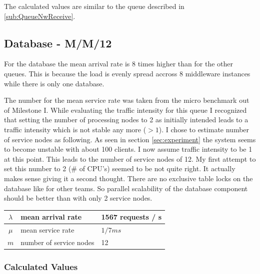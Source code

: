 \documentclass[a4paper]{article}
\begin{document}
The calculated values are similar to the queue described in \ref{sub:QueueNwReceive}. 


\subsection{Database - M/M/12}
\label{sub:QueueDatabase}

For the database the mean arrival rate is 8 times higher than for the other queues. This is because the load is evenly spread accross 8 middleware instances while there is only one database.

The number for the mean service rate was taken from the micro benchmark out of Milestone I. While evaluating the traffic intensity for this queue I recognized that setting the number of processing nodes to 2 as initially intended leads to a traffic intensity which is not stable any more ($>1$). I chose to estimate number of service nodes as following. As seen in section \ref{sec:experiment} the system seems to become unstable with about 100 clients. I now assume traffic intensity to be 1 at this point. This leads to the number of service nodes of 12. My first attempt to set this number to 2 (\# of CPU's) seemed to be not quite right. It actually makes sense giving it a second thought. There are no exclusive table locks on the database  like for other teams. So parallel scalability of the database component should be better than with only 2 service nodes.\\

\begin{tabular}{|c|l|l|}
\hline 
$\lambda$ & mean arrival rate & 1567 requests / s \\ 
\hline 
$\mu$ & mean service rate & $1/7ms$ \\ 
\hline 
$m$ & number of service nodes & 12 \\ 
\hline 
\end{tabular} 

\subsubsection{Calculated Values}
\end{document}
